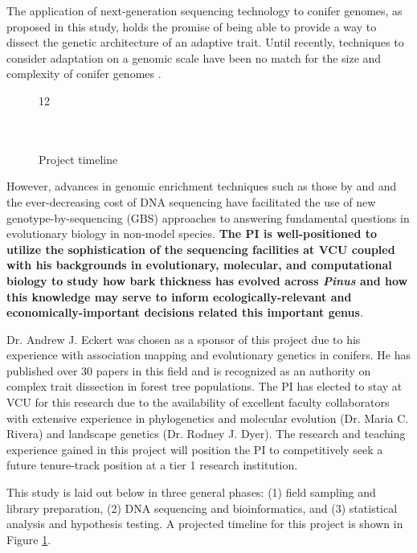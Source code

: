 The application of next-generation sequencing technology to conifer genomes, as proposed in this study, holds the promise of 
being able to provide a way to dissect the genetic architecture of an adaptive trait.  Until recently, techniques 
to consider adaptation on a genomic scale have been no match for the size and complexity of conifer genomes \citep{Mackay:2012hr}.  
\begin{figure}
	\begin{ganttchart}[vgrid,
	bar/.style={fill=gray!40}, 
	title/.style={fill=gray!10}]{12}
	\\
	\\
	\\
	\end{ganttchart}
\caption{Project timeline}
\vspace{-10pt}
\label{f:timeline}
\end{figure}
However, advances in genomic enrichment techniques such as those by \citet{Parchman:2012ca} and \citet{Willing:2011jb} and 
the ever-decreasing cost of DNA sequencing have facilitated the use of new genotype-by-sequencing (GBS) approaches to 
answering fundamental questions in evolutionary biology in non-model species.  \textbf{The PI is well-positioned to utilize the 
sophistication of the sequencing facilities at VCU coupled with his backgrounds in evolutionary, molecular, and 
computational biology to study how bark thickness has evolved across \emph{Pinus} and how this knowledge may serve to 
inform ecologically-relevant and economically-important decisions related this important genus}.

Dr. Andrew J. Eckert was chosen as a sponsor of this project due to his experience with association mapping 
and evolutionary genetics in conifers. He has published over 30 papers in this field and is recognized as an authority 
on complex trait dissection in forest tree populations.  The PI has elected to stay at VCU for this research due to the availability 
of excellent faculty collaborators with extensive experience in phylogenetics and molecular evolution (Dr. Maria C. Rivera) and 
landscape genetics (Dr. Rodney J. Dyer).  The research and teaching experience gained in this project will position the PI to 
competitively seek a future tenure-track position at a tier 1 research institution.      

This study is laid out below in three general phases: (1) field sampling and library preparation, (2) DNA sequencing and bioinformatics, 
and (3) statistical analysis and hypothesis testing.  A projected timeline for this project is shown in Figure \ref{f:timeline}.

